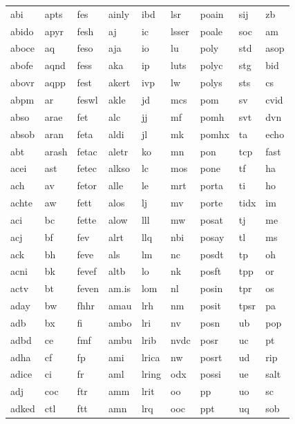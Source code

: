 \begin{table}[]
\begin{tabular}{@{}lllllllll@{}}
abi   & apts  & fes   & ainly & ibd   & lsr   & poain & sij   & zb    \\
abido & apyr  & fesh  & aj    & ic    & lsser & poale & soc   & am    \\
aboce & aq    & feso  & aja   & io    & lu    & poly  & std   & asop  \\
abofe & aqnd  & fess  & aka   & ip    & luts  & polyc & stg   & bid   \\
abovr & aqpp  & fest  & akert & ivp   & lw    & polys & sts   & cs    \\
abpm  & ar    & feswl & akle  & jd    & mcs   & pom   & sv    & cvid  \\
abso  & arae  & fet   & alc   & jj    & mf    & pomh  & svt   & dvn   \\
absob & aran  & feta  & aldi  & jl    & mk    & pomhx & ta    & echo  \\
abt   & arash & fetac & aletr & ko    & mn    & pon   & tcp   & fast  \\
acei  & ast   & fetec & alkso & lc    & mos   & pone  & tf    & ha    \\
ach   & av    & fetor & alle  & le    & mrt   & porta & ti    & ho    \\
achte & aw    & fett  & alos  & lj    & mv    & porte & tidx  & im    \\
aci   & bc    & fette & alow  & lll   & mw    & posat & tj    & me    \\
acj   & bf    & fev   & alrt  & llq   & nbi   & posay & tl    & ms    \\
ack   & bh    & feve  & als   & lm    & nc    & posdt & tp    & oh    \\
acni  & bk    & fevef & altb  & lo    & nk    & posft & tpp   & or    \\
actv  & bt    & feven & am.is & lom   & nl    & posin & tpr   & os    \\
aday  & bw    & fhhr  & amau  & lrh   & nm    & posit & tpsr  & pa    \\
adb   & bx    & fi    & ambo  & lri   & nv    & posn  & ub    & pop   \\
adbd  & ce    & fmf   & ambu  & lrib  & nvdc  & posr  & uc    & pt    \\
adha  & cf    & fp    & ami   & lrica & nw    & posrt & ud    & rip   \\
adice & ci    & fr    & aml   & lring & odx   & possi & ue    & salt  \\
adj   & coc   & ftr   & amm   & lrit  & oo    & pp    & uo    & sc    \\
adked & ctl   & ftt   & amn   & lrq   & ooc   & ppt   & uq    & sob   \\

\end{tabular}
\end{table}
